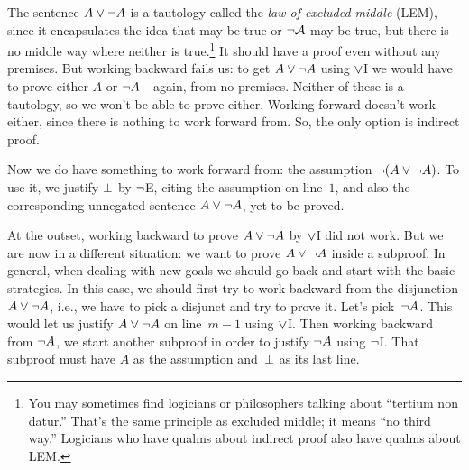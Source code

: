 The sentence $A \vee \neg A$ is a tautology called the \emph{law of
excluded middle} (LEM), since it encapsulates the idea that  may be true or $\neg \mathcal{A}$ may be true, but there is no middle way where neither is true.\footnote{You may sometimes find logicians or philosophers talking about ``tertium non datur.'' That's the same principle as excluded middle; it means ``no third way.'' Logicians who have qualms about indirect proof also have qualms about LEM.} It should have a proof even without any premises. But working backward fails us: to get $A \vee \neg A$ using $\vee$I we would have to prove either $A$ or $\neg A$---again, from no premises. Neither of these is a tautology, so we won't be able to prove either. Working forward doesn't work either, since there is nothing to work forward from. So, the only option is indirect proof.
\begin{fitchproof}
	\open
	\AS
	\ellipsesline
	\close
\end{fitchproof}
Now we do have something to work forward from: the assumption $\neg(A \vee \neg A)$. To use it, we justify $\bot$ by $\neg$E, citing the assumption on line~$1$, and also the corresponding unnegated sentence $A \vee \neg A$, yet to be proved.
\begin{fitchproof}
	\open
	\AS
	\ellipsesline
	\close
\end{fitchproof}
At the outset, working backward to prove $A \vee\neg A$ by $\vee$I did not work. But we are now in a different situation: we want to prove $A \vee\neg A$ inside a subproof. In general, when dealing with new goals we should go back and start with the basic strategies. In this case, we should first try to work backward from the disjunction $A \vee \neg A$, i.e., we have to pick a disjunct and try to prove it. Let's pick~$\neg A$. This would let us justify $A \vee \neg A$ on line~$m - 1$ using $\vee$I. Then working backward from $\neg A$, we start another subproof in order to justify $\neg A$ using $\neg$I. That subproof must have $A$ as the assumption and~$\bot$ as its last line.
\begin{fitchproof}
	\open
	\AS
	\open
	\AS
	\ellipsesline
	\close
	\close
\end{fitchproof}
